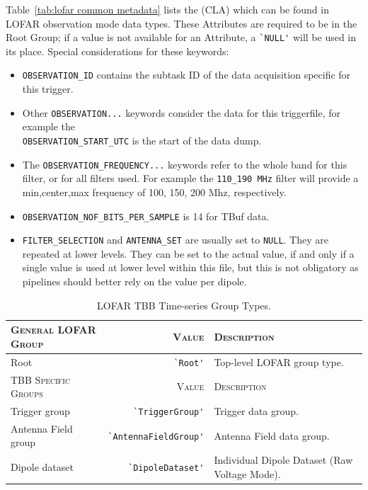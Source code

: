 \documentclass[a4paper,10pt,bibtotoc]{scrartcl}
\begin{document}
Table~\ref{tab:lofar common metadata} lists the {\cla} (CLA) which can
be found in LOFAR observation mode data types. These Attributes are required to be in the Root
Group; if a value is not available for an Attribute, a \verb|`NULL'|
will be used in its place. Special considerations for these keywords:
\begin{itemize}
    \item \texttt{OBSERVATION\_ID} contains the subtask ID of the data acquisition specific for this trigger. \item Other \texttt{OBSERVATION...} keywords consider the data for this triggerfile, for example the\\ \texttt{OBSERVATION\_START\_UTC} is the start of the data dump. 
    \item The \texttt{OBSERVATION\_FREQUENCY...} keywords refer to the whole band for this filter, or for all filters used. For example the \texttt{110\_190 MHz} filter will provide a min,center,max frequency of 100, 150, 200 Mhz, respectively. 
    \item \texttt{OBSERVATION\_NOF\_BITS\_PER\_SAMPLE} is 14 for TBuf data. 
    \item \texttt{FILTER\_SELECTION} and \texttt{ANTENNA\_SET} are usually set to \texttt{NULL}. They are repeated at lower levels. They can be set to the actual value, if and only if a single value is used at lower level within this file, but this is not obligatory as pipelines should better rely on the value per dipole.
\end{itemize}

\begin{table}[tbp]
  \centering
  \begin{tabular}{|lrp{6cm}|}
    \hline
    \textsc{General LOFAR Group} & \textsc{Value} & \textsc{Description} \\
    \hline
    Root          & \verb|`Root'|    & Top-level LOFAR group type.\\
    \hline
    \hline
    \textsc{TBB Specific Groups} & \textsc{Value} & \textsc{Description} \\
    \hline
    
    Trigger group & \verb|`TriggerGroup'| &  Trigger data group. \\
    Antenna Field group & \verb|`AntennaFieldGroup'|  & Antenna Field data group. \\
    Dipole dataset & \verb|`DipoleDataset'| & Individual Dipole Dataset (Raw Voltage Mode). \\
    \hline
  \end{tabular}
  \caption{LOFAR TBB Time-series Group Types.}
  \label{tab:group types}
\end{table}
\end{document}
